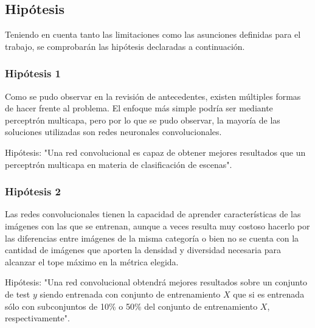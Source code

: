 \subsection{Hipótesis}
Teniendo en cuenta tanto las limitaciones como las asunciones definidas para el trabajo, se comprobarán las hipótesis declaradas a continuación. 

\subsubsection{Hipótesis 1} \label{sssec:hipotesis1}
Como se pudo observar en la revisión de antecedentes, existen múltiples formas de hacer frente al problema. El enfoque más simple podría ser mediante perceptrón multicapa, pero por lo que se pudo observar, la mayoría de las soluciones utilizadas son redes neuronales convolucionales. 

Hipótesis: "Una red convolucional es capaz de obtener mejores resultados que un perceptrón multicapa en materia de clasificación de escenas".

\subsubsection{Hipótesis 2} \label{sssec:hipotesis2}
Las redes convolucionales tienen la capacidad de aprender características de las imágenes con las que se entrenan, aunque a veces resulta muy costoso hacerlo por las diferencias entre imágenes de la misma categoría o bien no se cuenta con la cantidad de imágenes que aporten la densidad y diversidad necesaria para alcanzar el tope máximo en la métrica elegida. 

Hipótesis: "Una red convolucional obtendrá mejores resultados sobre un conjunto de test \(y\) siendo entrenada con conjunto de entrenamiento \(X\) que si es entrenada sólo con subconjuntos de 10\% o 50\% del conjunto de entrenamiento \(X\), respectivamente".


